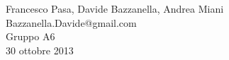 \begin{center}

     	{\huge }
	\vspace{0.5cm}

      	{\large Francesco Pasa, Davide Bazzanella, Andrea Miani} \\
      	{Bazzanella.Davide@gmail.com} \\
		{\large Gruppo A6} \\
	
	\vspace{0.3cm}
      	{\large 30 ottobre 2013}

\end{center}
